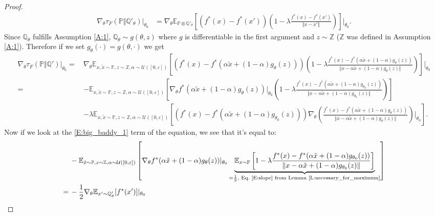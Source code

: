 \documentclass{article}
\begin{document}
\begin{proof}
\begin{align*}
  \nabla_\theta\tau_F(\mathbb P\Vert\mathbb Q'_\theta)|_{\theta_0}
  &=\nabla_\theta\mathbb E_{\mathbb P\otimes\mathbb Q'_{\theta}}[(f^*(x)-f^*(x'))(1-\lambda\frac{f^*(x)-f^*(x')}{\Vert x-x'\Vert})]|_{\theta_0}.
\end{align*}
Since $\mathbb Q_\theta$ fulfills Assumption \ref{A:1}, $\mathbb Q_\theta\sim g(\theta,z)$ where $g$ is differentiable in the first argument and $z\sim\mathbb Z$
($\mathbb Z$ was defined in Assumption \ref{A:1}).
Therefore if we set $g_\theta(\cdot)=g(\theta,\cdot)$ we get
\begin{align}
\nabla_\theta\tau_F(\mathbb P\Vert\mathbb Q')|_{\theta_0}
  \nonumber =\,&\nabla_\theta\mathbb E_{x,\tilde x\sim\mathbb P, z\sim\mathbb Z,\alpha\sim\mathcal U([0,\varepsilon])}\left[(f^*(x)-f^*(\alpha\tilde x + (1-\alpha)g_\theta(z)))\left(1-\lambda\frac{f^*(x)-f^*(\alpha\tilde x + (1-\alpha)g_\theta(z))}{\Vert x-\alpha\tilde x + (1-\alpha)g_\theta(z)\Vert}\right)\right]\bigg|_{\theta_0} \\
  \label{E:big_baddy_1}=\,&-\mathbb E_{x,\tilde x\sim\mathbb P, z\sim\mathbb Z,\alpha\sim\mathcal U([0,\varepsilon])}\left[\nabla_\theta f^*(\alpha\tilde x + (1-\alpha)g_\theta(z))|_{\theta_0}\left(1-\lambda\frac{f^*(x)-f^*(\alpha\tilde x + (1-\alpha)g_{\theta_0}(z))}{\Vert x-\alpha\tilde x + (1-\alpha)g_{\theta_0}(z)\Vert}\right)\right] \\
  \label{E:big_baddy_2}&-\lambda\mathbb E_{x,\tilde x\sim\mathbb P, z\sim\mathbb Z,\alpha\sim\mathcal U([0,\varepsilon])}\left[(f^*(x)-f^*(\alpha\tilde x + (1-\alpha)g_{\theta_0}(z)))\nabla_\theta\left(\frac{f^*(x)-f^*(\alpha\tilde x + (1-\alpha)g_\theta(z))}{\Vert x-\alpha\tilde x + (1-\alpha)g_\theta(z)\Vert}\right)\bigg|_{\theta_0}\right].
  \end{align}
  Now if we look at the \ref{E:big_baddy_1} term of the equation, we see that it's equal to:
  \begin{align*}
  &-\mathbb E_{\tilde x\sim\mathbb P, z\sim\mathbb Z,\alpha\sim\mathcal U([0,\varepsilon])}\left[\nabla_\theta f^*(\alpha\tilde x + (1-\alpha)g_\theta(z))|_{\theta_0}\underbrace{\mathbb E_{x\sim\mathbb P}\left[1-\lambda\frac{f^*(x)-f^*(\alpha\tilde x + (1-\alpha)g_{\theta_0}(z))}{\Vert x-\alpha\tilde x + (1-\alpha)g_{\theta_0}(z)\Vert}\right]}_{=\frac{1}{2}, \text{ Eq.\ \ref{E:slope} from Lemma \ref{L:necessary_for_maximum}}}\right] \\
  =\,&-\frac 1 2 \nabla_\theta\mathbb E_{x'\sim\mathbb Q'_\theta}[f^*(x')]|_{\theta_0} 
  \end{align*}

\end{proof}
\end{document}
